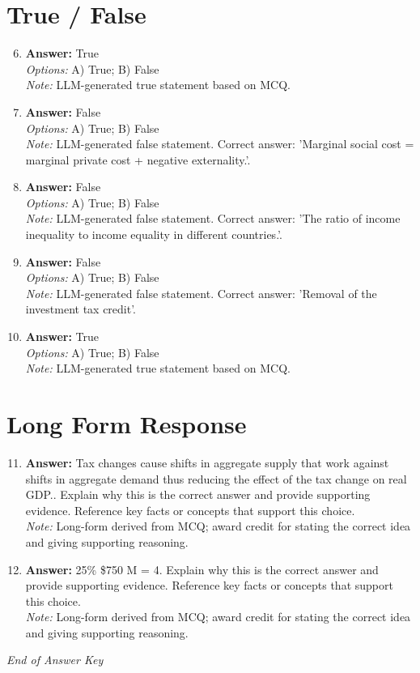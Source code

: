 \documentclass[12pt]{article}
\begin{document}
\section*{True / False}
\begin{enumerate}[label=\arabic*.]
\setcounter{enumi}{5}
\item \textbf{Answer:} True
\\ \textit{Options:} A) True; B) False
\\ \textit{Note:} LLM-generated true statement based on MCQ.
\item \textbf{Answer:} False
\\ \textit{Options:} A) True; B) False
\\ \textit{Note:} LLM-generated false statement. Correct answer: 'Marginal social cost = marginal private cost + negative externality.'.
\item \textbf{Answer:} False
\\ \textit{Options:} A) True; B) False
\\ \textit{Note:} LLM-generated false statement. Correct answer: 'The ratio of income inequality to income equality in different countries.'.
\item \textbf{Answer:} False
\\ \textit{Options:} A) True; B) False
\\ \textit{Note:} LLM-generated false statement. Correct answer: 'Removal of the investment tax credit'.
\item \textbf{Answer:} True
\\ \textit{Options:} A) True; B) False
\\ \textit{Note:} LLM-generated true statement based on MCQ.
\end{enumerate}

\section*{Long Form Response}
\begin{enumerate}[label=\arabic*.]
\setcounter{enumi}{10}
\item \textbf{Answer:} Tax changes cause shifts in aggregate supply that work against shifts in aggregate demand thus reducing the effect of the tax change on real GDP.. Explain why this is the correct answer and provide supporting evidence. Reference key facts or concepts that support this choice.
\\ \textit{Note:} Long-form derived from MCQ; award credit for stating the correct idea and giving supporting reasoning.
\item \textbf{Answer:} 25\% \$750 M = 4. Explain why this is the correct answer and provide supporting evidence. Reference key facts or concepts that support this choice.
\\ \textit{Note:} Long-form derived from MCQ; award credit for stating the correct idea and giving supporting reasoning.
\end{enumerate}

\vfill
\noindent\textit{End of Answer Key}
\end{document}
